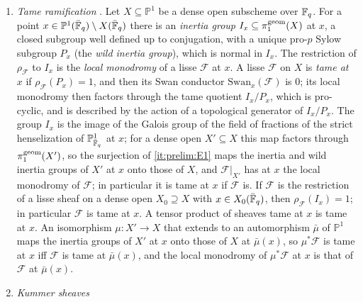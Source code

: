 \begin{enumerate}[label=\textup{(E\arabic*)},leftmargin=*]
  eigenvalue $\alpha$ of $\mathrm{Frob}_x$ on $\mathcal F_{\bar x}$
  satisfies $|\jmath(\alpha)|=N(x)^{w/2}$, and \emph{pure of weight $w$} if it
  is $\jmath$-pure of weight $w$ for every choice of $\jmath$. A sheaf is
  \emph{$\jmath$-mixed of weights $\le w$} if it has a finite filtration
  whose successive quotients are $\jmath$-pure of weights $\le w$; a pure
  sheaf of weight $w$ is $\jmath$-mixed of weights $\le w$. The tensor
  product of lisse sheaves pure of weights $w$, $w'$ is pure of weight
  $w+w'$, and $\mu^*$ ($\mu$ an isomorphism) preserves purity.
\item\label{it:prelim:E3} \emph{Tame ramification} \cite[Ch.~1]{KatzGKM}.
  Let $X\subseteq\mathbb P^1$ be a dense open subscheme over $\mathbb F_q$. For a
  point $x\in\mathbb P^1(\bar{\mathbb F}_q)\setminus X(\bar{\mathbb F}_q)$ there is an
  \emph{inertia group} $I_x\subseteq\pi_1^{\rm geom}(X)$ at $x$, a closed
  subgroup well defined up to conjugation, with a unique pro-$p$ Sylow
  subgroup $P_x$ (the \emph{wild inertia group}), which is normal in $I_x$.
  The restriction of $\rho_{\mathcal F}$ to $I_x$ is the \emph{local
  monodromy} of a lisse $\mathcal F$ at $x$. A lisse $\mathcal F$ on $X$ is
  \emph{tame at $x$} if $\rho_{\mathcal F}(P_x)=1$, and then its Swan
  conductor $\mathrm{Swan}_x(\mathcal F)$ is $0$; its local monodromy then
  factors through the tame quotient $I_x/P_x$, which is pro-cyclic, and is
  described by the action of a topological generator of $I_x/P_x$. The
  group $I_x$ is the image of the Galois group of the field of fractions of
  the strict henselization of $\mathbb P^1_{\bar{\mathbb F}_q}$ at $x$; for a dense
  open $X'\subseteq X$ this map factors through $\pi_1^{\rm geom}(X')$, so the
  surjection of \ref{it:prelim:E1} maps the inertia and wild inertia groups of
  $X'$ at $x$ onto those of $X$, and $\mathcal F|_{X'}$ has at $x$ the local
  monodromy of $\mathcal F$; in particular it is tame at $x$ if $\mathcal F$
  is. If
  $\mathcal F$ is the restriction of a lisse sheaf on a dense open
  $X_0\supseteq X$ with $x\in X_0(\bar{\mathbb F}_q)$, then
  $\rho_{\mathcal F}(I_x)=1$; in particular $\mathcal F$ is tame at $x$. A
  tensor product of sheaves tame at $x$ is tame at $x$. An isomorphism
  $\mu:X'\to X$ that extends to an automorphism $\bar\mu$ of $\mathbb P^1$
  maps the inertia groups of $X'$ at $x$ onto those of $X$ at $\bar\mu(x)$,
  so $\mu^*\mathcal F$ is tame at $x$ iff $\mathcal F$ is tame at
  $\bar\mu(x)$, and the local monodromy of $\mu^*\mathcal F$ at $x$ is that
  of $\mathcal F$ at $\bar\mu(x)$.
\item\label{it:prelim:E4} \emph{Kummer sheaves}

\end{enumerate}
